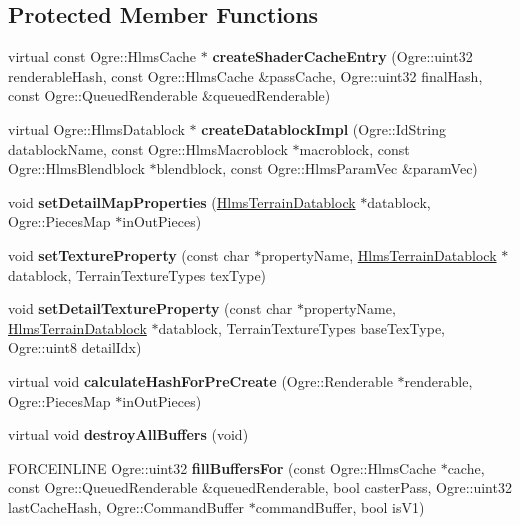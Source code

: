 \subsection*{Protected Member Functions}
\begin{DoxyCompactItemize}
\item 
\mbox{\label{class_hlms_terrain_af453118217d4139de33cabdee9fca719}} 
virtual const Ogre\+::\+Hlms\+Cache $\ast$ {\bfseries create\+Shader\+Cache\+Entry} (Ogre\+::uint32 renderable\+Hash, const Ogre\+::\+Hlms\+Cache \&pass\+Cache, Ogre\+::uint32 final\+Hash, const Ogre\+::\+Queued\+Renderable \&queued\+Renderable)
\item 
\mbox{\label{class_hlms_terrain_ab42a5fdf5b3705b4b2f81da90ff1d8d5}} 
virtual Ogre\+::\+Hlms\+Datablock $\ast$ {\bfseries create\+Datablock\+Impl} (Ogre\+::\+Id\+String datablock\+Name, const Ogre\+::\+Hlms\+Macroblock $\ast$macroblock, const Ogre\+::\+Hlms\+Blendblock $\ast$blendblock, const Ogre\+::\+Hlms\+Param\+Vec \&param\+Vec)
\item 
\mbox{\label{class_hlms_terrain_aca2bde1f888fc0e2f383714c015cf677}} 
void {\bfseries set\+Detail\+Map\+Properties} (\hyperlink{class_hlms_terrain_datablock}{Hlms\+Terrain\+Datablock} $\ast$datablock, Ogre\+::\+Pieces\+Map $\ast$in\+Out\+Pieces)
\item 
\mbox{\label{class_hlms_terrain_a2f485c0bf2015e6c5773e0bb57b7c809}} 
void {\bfseries set\+Texture\+Property} (const char $\ast$property\+Name, \hyperlink{class_hlms_terrain_datablock}{Hlms\+Terrain\+Datablock} $\ast$datablock, Terrain\+Texture\+Types tex\+Type)
\item 
\mbox{\label{class_hlms_terrain_ae148c9e6e4eede07e460560153058e26}} 
void {\bfseries set\+Detail\+Texture\+Property} (const char $\ast$property\+Name, \hyperlink{class_hlms_terrain_datablock}{Hlms\+Terrain\+Datablock} $\ast$datablock, Terrain\+Texture\+Types base\+Tex\+Type, Ogre\+::uint8 detail\+Idx)
\item 
\mbox{\label{class_hlms_terrain_ad5b8458a8de30b6910612e746825234e}} 
virtual void {\bfseries calculate\+Hash\+For\+Pre\+Create} (Ogre\+::\+Renderable $\ast$renderable, Ogre\+::\+Pieces\+Map $\ast$in\+Out\+Pieces)
\item 
\mbox{\label{class_hlms_terrain_adedc4dbb3be85f823b0dbab3ae5fcf72}} 
virtual void {\bfseries destroy\+All\+Buffers} (void)
\item 
\mbox{\label{class_hlms_terrain_a7657417eacda62e4d6462243aca0364a}} 
F\+O\+R\+C\+E\+I\+N\+L\+I\+NE Ogre\+::uint32 {\bfseries fill\+Buffers\+For} (const Ogre\+::\+Hlms\+Cache $\ast$cache, const Ogre\+::\+Queued\+Renderable \&queued\+Renderable, bool caster\+Pass, Ogre\+::uint32 last\+Cache\+Hash, Ogre\+::\+Command\+Buffer $\ast$command\+Buffer, bool is\+V1)
\end{DoxyCompactItemize}
